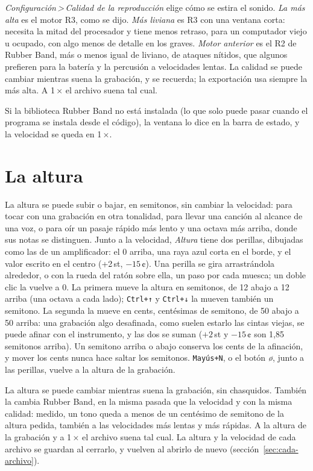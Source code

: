 \documentclass[12pt,
              article,
              oneside
              ]{memoir}
\newcommand*{\menu}[1]{\textit{#1}}
\newcommand*{\then}{\,>\,}
\newcommand*{\key}[1]{\texttt{#1}}
\begin{document}
%
\menu{Configuración\then Calidad de la reproducción} elige cómo se estira
el sonido. \menu{La más alta} es el motor R3, como se dijo. \menu{Más
liviana} es R3 con una ventana corta: necesita la mitad del procesador y
tiene menos retraso, para un computador viejo u ocupado, con algo menos de
detalle en los graves. \menu{Motor anterior} es el R2 de Rubber Band, más o
menos igual de liviano, de ataques nítidos, que algunos prefieren para la
batería y la percusión a velocidades lentas. La calidad se puede cambiar
mientras suena la grabación, y se recuerda; la exportación usa siempre la
más alta. A
1\,× el archivo suena tal cual.

%
Si la biblioteca Rubber Band no está instalada (lo que solo puede pasar
cuando el programa se instala desde el código), la ventana lo dice en la
barra de estado, y la velocidad se queda en 1\,×.

\section{La altura}
\label{sec:altura}

%
La altura se puede subir o bajar, en semitonos, sin cambiar la velocidad:
para tocar con una grabación en otra tonalidad, para llevar una canción al
alcance de una voz, o para oír un pasaje rápido más lento y una octava más
arriba, donde sus notas se distinguen. Junto a la velocidad, \menu{Altura}
tiene dos perillas, dibujadas como las de un amplificador: el 0 arriba, una
raya azul corta en el borde, y el valor escrito en el centro (+2\,st,
$-15$\,¢). Una
perilla se gira arrastrándola alrededor, o con la rueda del ratón sobre
ella, un paso por cada muesca; un doble clic la vuelve a 0. La primera mueve la altura en
semitonos, de 12 abajo a 12 arriba (una octava a cada lado); \key{Ctrl+↑}
y \key{Ctrl+↓} la mueven también un semitono. La segunda la mueve en
cents, centésimas de semitono, de 50 abajo a 50 arriba: una grabación algo
desafinada, como suelen estarlo las cintas viejas, se puede afinar con el
instrumento, y las dos se suman ($+2$\,st y $-15$\,¢ son 1,85 semitonos
arriba). Un semitono arriba o abajo conserva los cents de la afinación, y
mover los cents nunca hace saltar los semitonos. \key{Mayús+N}, o el botón
\menu{ø}, junto a las perillas, vuelve a la altura de la grabación.

%
La altura se puede cambiar mientras suena la grabación, sin chasquidos.
También la cambia Rubber Band, en la misma pasada que la velocidad y con la
misma calidad: medido, un tono queda a menos de un centésimo de semitono
de la altura pedida, también a las velocidades más lentas y más
rápidas. A la altura de la grabación y a 1\,× el archivo
suena tal cual. La altura y la velocidad de cada archivo se guardan al
cerrarlo, y vuelven al abrirlo de nuevo (sección~\ref{sec:cada-archivo}).
\end{document}
